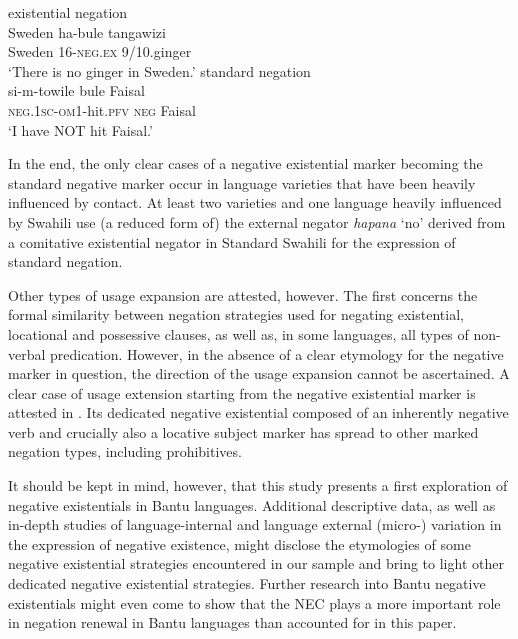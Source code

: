 \documentclass[output=paper,draft,draftmode,colorlinks,citecolor=brown]{langscibook}
\begin{document}
\ea\label{ex:kami-ginger-Faisal}
%

\ea\label{ex:kami-ginger} existential negation\\
\gll Sweden ha-bule tangawizi\\
	Sweden 16-\textsc{neg.ex} 9/10.ginger\\
\glt `There is no ginger in Sweden.'
%
\ex\label{ex:kami-Faisal} standard negation\\
\gll si-m-towile bule Faisal\\
	\textsc{neg.1sc}-\textsc{om}1-hit.\textsc{pfv} \textsc{neg} Faisal\\
\glt `I have NOT hit Faisal.'
\z
\z

%
In the end, the only clear cases of a negative existential marker becoming
the standard negative marker occur in language varieties that have been heavily influenced
by contact. At least two  varieties and one language heavily
influenced by Swahili use (a reduced form of) the external negator
\textit{hapana} `no' derived from a comitative existential negator in
Standard Swahili for the expression of standard negation.

Other types of usage expansion are attested, however. The first concerns the formal similarity between negation strategies used for negating existential, locational and possessive clauses, as well as, in some languages, all types of non-verbal predication. However, in the absence of a clear etymology for the negative marker in question, the direction of the usage expansion cannot be ascertained. A clear case of usage extension starting from the negative existential marker is attested in . Its dedicated negative existential composed of an inherently negative verb and crucially also a locative subject marker has spread to other marked negation types, including prohibitives.

It should be kept in mind, however, that this study presents a first exploration of negative existentials in Bantu languages. Additional descriptive data, as well as in-depth studies of language-internal and language external (micro-) variation in the expression of negative existence, might disclose the etymologies of some negative existential strategies encountered
in our sample and bring to light other dedicated negative existential strategies. Further research into Bantu negative existentials might even come to show that the NEC plays a more important role in negation renewal in Bantu languages than accounted for in this paper.
\end{document}
